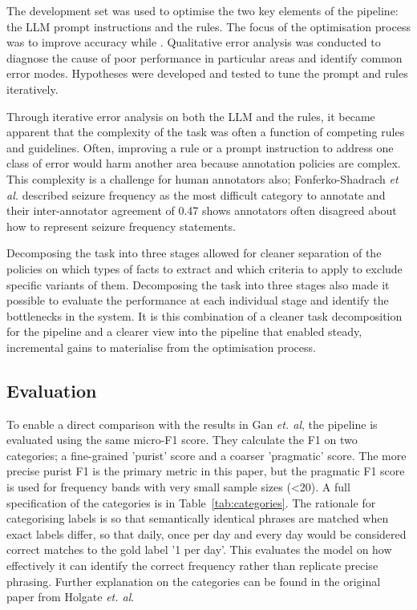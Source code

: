 \documentclass[conference]{IEEEtran}
\begin{document}
The development set was used to optimise the two key 
elements of the pipeline: the LLM prompt instructions and 
the rules. The focus of the optimisation process was to 
improve accuracy while . Qualitative error analysis was 
conducted to diagnose the cause of poor performance 
in particular areas and identify common error modes. 
Hypotheses were developed and tested to tune the 
prompt and rules iteratively. 

Through iterative error analysis on both the LLM and 
the rules, it became apparent that the complexity of the 
task was often a function of competing rules and 
guidelines. Often, improving a rule or a prompt 
instruction to address one class of error would harm 
another area because annotation policies are complex.
This complexity is a challenge for human annotators 
also; Fonferko-Shadrach \emph{et al.} described seizure
frequency as the most difficult category to annotate
and their inter-annotator agreement of 0.47 shows 
annotators often disagreed about how to represent
seizure frequency statements.

Decomposing the task into three stages allowed for 
cleaner separation of the policies on which types of 
facts to extract and which criteria to apply to exclude
specific variants of them. Decomposing the task into
three stages also made it possible to evaluate the 
performance at each individual stage and identify the 
bottlenecks in the system. It is this combination of 
a cleaner task decomposition for the pipeline and a
clearer view into the pipeline that enabled steady,
incremental gains to materialise from the optimisation
process.

\subsection{Evaluation}

To enable a direct comparison with the results in Gan \emph{et. al},
the pipeline is evaluated using the same micro-F1 score. They 
calculate the F1 on two categories; a fine-grained 'purist' score
and a coarser 'pragmatic' score. The more precise purist F1 is 
the primary metric in this paper, but the pragmatic F1 score is 
used for frequency bands with very small sample sizes (\textless20). A 
full specification of the categories is in Table~\ref{tab:categories}. The rationale for 
categorising labels is so that semantically identical phrases 
are matched when exact labels differ, so that daily, once per day 
and every day would be considered correct matches to the gold
label '1 per day'. This evaluates the model on how effectively
it can identify the correct frequency rather than replicate 
precise phrasing. Further explanation on the categories can be
found in the original paper from Holgate \emph{et. al}.
\end{document}
